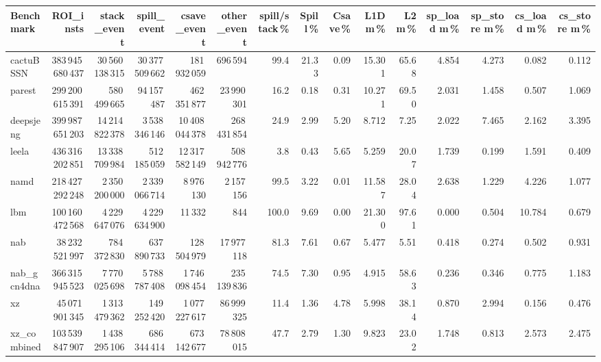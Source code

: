 \documentclass[9pt,landscape,a4paper]{article}
\begin{document}
\vspace{2mm}
\centering
\begin{adjustbox}{max width=\textwidth, max totalheight=0.50\textheight}%
\begin{tabular}{lrrrrrrrrrrrrrr}
\toprule
Benchmark & ROI\_insts & stack\_event & \textbf{spill\_event} & csave\_event & other\_event & spill/stack\,\% & Spill\,\% & Csave\,\% & L1D m\,\% & L2 m\,\% & sp\_load m\,\% & sp\_store m\,\% & cs\_load m\,\% & cs\_store m\,\% \\
\midrule
cactuBSSN & 383\,945\,680\,437 & 30\,560\,138\,315 & 30\,377\,509\,662 & 181\,932\,059 & 696\,594 & 99.4 & 21.33 & 0.09 & 15.301 & 65.68 & 4.854 & 4.273 & 0.082 & 0.112 \\
parest & 299\,200\,615\,391 & 580\,499\,665 & 94\,157\,487 & 462\,351\,877 & 23\,990\,301 & 16.2 & 0.18 & 0.31 & 10.271 & 69.50 & 2.031 & 1.458 & 0.507 & 1.069 \\
deepsjeng & 399\,987\,651\,203 & 14\,214\,822\,378 & 3\,538\,346\,146 & 10\,408\,044\,378 & 268\,431\,854 & 24.9 & 2.99 & 5.20 & 8.712 & 7.25 & 2.022 & 7.465 & 2.162 & 3.395 \\
leela & 436\,316\,202\,851 & 13\,338\,709\,984 & 512\,185\,059 & 12\,317\,582\,149 & 508\,942\,776 & 3.8 & 0.43 & 5.65 & 5.259 & 20.07 & 1.739 & 0.199 & 1.591 & 0.409 \\
namd & 218\,427\,292\,248 & 2\,350\,200\,000 & 2\,339\,066\,714 & 8\,976\,130 & 2\,157\,156 & 99.5 & 3.22 & 0.01 & 11.587 & 28.04 & 2.638 & 1.229 & 4.226 & 1.077 \\
lbm & 100\,160\,472\,568 & 4\,229\,647\,076 & 4\,229\,634\,900 & 11\,332 & 844 & 100.0 & 9.69 & 0.00 & 21.300 & 97.61 & 0.000 & 0.504 & 10.784 & 0.679 \\
nab & 38\,232\,521\,997 & 784\,372\,830 & 637\,890\,733 & 128\,504\,979 & 17\,977\,118 & 81.3 & 7.61 & 0.67 & 5.477 & 5.51 & 0.418 & 0.274 & 0.502 & 0.931 \\
nab\_gcn4dna & 366\,315\,945\,523 & 7\,770\,025\,698 & 5\,788\,787\,408 & 1\,746\,098\,454 & 235\,139\,836 & 74.5 & 7.30 & 0.95 & 4.915 & 58.63 & 0.236 & 0.346 & 0.775 & 1.183 \\
xz & 45\,071\,901\,345 & 1\,313\,479\,362 & 149\,252\,420 & 1\,077\,227\,617 & 86\,999\,325 & 11.4 & 1.36 & 4.78 & 5.998 & 38.14 & 0.870 & 2.994 & 0.156 & 0.476 \\
xz\_combined & 103\,539\,847\,907 & 1\,438\,295\,106 & 686\,344\,414 & 673\,142\,677 & 78\,808\,015 & 47.7 & 2.79 & 1.30 & 9.823 & 23.02 & 1.748 & 0.813 & 2.573 & 2.475 \\

\end{tabular}
\end{adjustbox}
\end{document}
